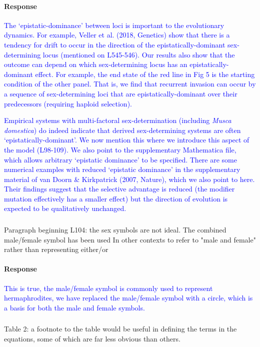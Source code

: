 \documentclass[10pt,letterpaper]{article}
\begin{document}
\noindent\paragraph{Response}
\textcolor{blue}{
The `epistatic-dominance' between loci is important to the evolutionary dynamics. For example, Veller et al. (2018, Genetics) show that there is a tendency for drift to occur in the direction of the epistatically-dominant sex-determining locus (mentioned on L545-546). Our results also show that the outcome can depend on which sex-determining locus has an epistatically-dominant effect. For example, the end state of the red line in Fig 5 is the starting condition of the other panel. That is, we find that recurrent invasion can occur by a sequence of sex-determining loci that are epistatically-dominant over their predecessors (requiring haploid selection). 
 }
 
\textcolor{blue}{
Empirical systems with multi-factoral sex-determination (including \textit{Musca domestica}) do indeed indicate that derived sex-determining systems are often `epistatically-dominant'. 
We now mention this where we introduce this aspect of the model (L98-109). 
We also point to the supplementary Mathematica file, which allows arbitrary `epistatic dominance' to be specified. 
There are some numerical examples with reduced `epistatic dominance' in the supplementary material of van Doorn \& Kirkpatrick (2007, Nature), which we also point to here.
Their findings suggest that the selective advantage is reduced (the modifier mutation effectively has a smaller effect) but the direction of evolution is expected to be qualitatively unchanged. 
}

\noindent\subsubsection{}
Paragraph beginning L104: the sex symbols are not ideal. The combined male/female symbol has been used In other contexts to refer to "male and female" rather than representing either/or

\noindent\paragraph{Response}
\textcolor{blue}{This is true, the male/female symbol is commonly used to represent hermaphrodites, we have replaced the male/female symbol with a circle, which is a basis for both the male and female symbols.}

\noindent\subsubsection{}
Table 2: a footnote to the table would be useful in defining the terms in the equations, some of which are far less obvious than others.
\end{document}
